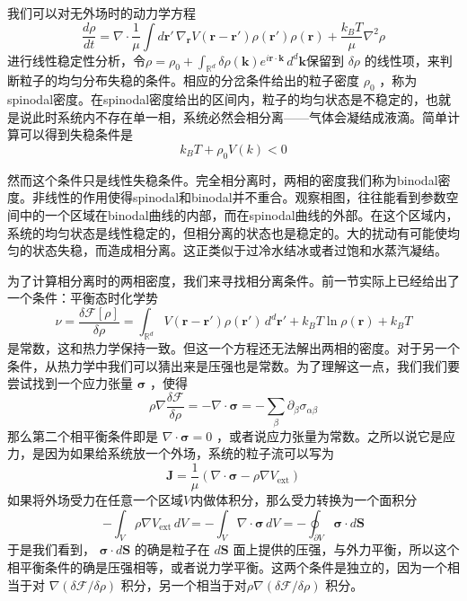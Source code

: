 \documentclass{ctexart}
\begin{document}
我们可以对无外场时的动力学方程
\begin{equation}
\frac{d\rho}{dt}=\nabla\cdot\frac{1}{\mu}\int d\bm{r}'\,\nabla_{\bm{r}} V(\bm{r}-\bm{r}')\rho(\bm{r'})\rho(\bm{r})+\frac{k_BT}{\mu}\nabla^2\rho
\end{equation}
进行线性稳定性分析，令$\rho=\rho_0+\int_{\mathbb{R}^d}\delta\rho(\bm{k}) e^{i\bm{r}\cdot\bm{k}}\,d^d\bm{k}$保留到 $\delta\rho$ 的线性项，来判断粒子的均匀分布失稳的条件。相应的分岔条件给出的粒子密度 $\rho_0$ ，称为spinodal密度。在spinodal密度给出的区间内，粒子的均匀状态是不稳定的，也就是说此时系统内不存在单一相，系统必然会相分离——气体会凝结成液滴。简单计算可以得到失稳条件是
\begin{equation}
k_BT+\rho_0V(k)<0
\end{equation}

然而这个条件只是线性失稳条件。完全相分离时，两相的密度我们称为binodal密度。非线性的作用使得spinodal和binodal并不重合。观察相图，往往能看到参数空间中的一个区域在binodal曲线的内部，而在spinodal曲线的外部。在这个区域内，系统的均匀状态是线性稳定的，但相分离的状态也是稳定的。大的扰动有可能使均匀的状态失稳，而造成相分离。这正类似于过冷水结冰或者过饱和水蒸汽凝结。

为了计算相分离时的两相密度，我们来寻找相分离条件。前一节实际上已经给出了一个条件：平衡态时化学势
\begin{equation}
\nu=\frac{\delta\mathcal{F}[\rho]}{\delta\rho}=\int_{\mathbb{R}^d} V(\bm{r}-\bm{r}')\rho(\bm{r}')\,d^d\bm{r}'+k_BT\ln\rho(\bm{r})+k_BT
\end{equation}
是常数，这和热力学保持一致。但这一个方程还无法解出两相的密度。对于另一个条件，从热力学中我们可以猜出来是压强也是常数。为了理解这一点，我们我们要尝试找到一个应力张量 $\bm{\sigma}$ ，使得
\begin{equation}
\rho\nabla\frac{\delta\mathcal{F}}{\delta\rho}=-\nabla\cdot\bm{\sigma}=-\sum_\beta\partial_\beta\sigma_{\alpha\beta}
\end{equation}
那么第二个相平衡条件即是 $\nabla\cdot\bm{\sigma}=0$ ，或者说应力张量为常数。之所以说它是应力，是因为如果给系统放一个外场，系统的粒子流可以写为
\begin{equation}
\bm{J}=\frac{1}{\mu}(\nabla\cdot\bm{\sigma}-\rho\nabla V_{\mathrm{ext}})
\end{equation}
如果将外场受力在任意一个区域$V$内做体积分，那么受力转换为一个面积分
\begin{equation}
-\int_V \rho\nabla V_{\mathrm{ext}}\,dV=-\int_V\nabla\cdot\bm{\sigma}\,dV=-\oint_{\partial V}\bm{\sigma}\cdot d\bm{S}
\end{equation}
于是我们看到， $\bm{\sigma}\cdot d\bm{S}$ 的确是粒子在 $d\bm{S}$ 面上提供的压强，与外力平衡，所以这个相平衡条件的确是压强相等，或者说力学平衡。这两个条件是独立的，因为一个相当于对 $\nabla(\delta\mathcal{F}/\delta\rho)$ 积分，另一个相当于对$\rho\nabla(\delta\mathcal{F}/\delta\rho)$ 积分。
\end{document}
